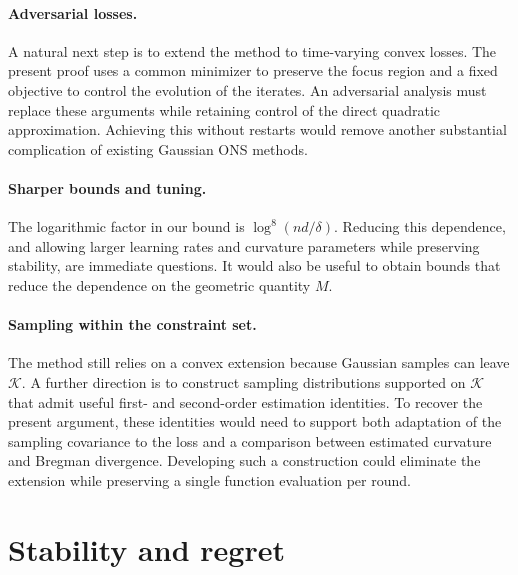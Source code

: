 \documentclass[12pt,cleveref]{jmlr}
\newcommand{\K}{\mathcal K}
\newcommand{\1}{\mathbf 1}
\begin{document}
\paragraph{Adversarial losses.}
A natural next step is to extend the method to time-varying convex losses.
The present proof uses a common minimizer to preserve the focus region
and a fixed objective to control the evolution of the iterates.
An adversarial analysis must replace these arguments while retaining
control of the direct quadratic approximation. Achieving this without
restarts would remove another substantial complication of existing
Gaussian ONS methods.

\paragraph{Sharper bounds and tuning.}
The logarithmic factor in our bound is $\log^8(nd/\delta)$.
Reducing this dependence, and allowing larger learning rates and curvature
parameters while preserving stability, are immediate questions.
It would also be useful to obtain bounds that reduce the dependence on the geometric quantity $M$.

\paragraph{Sampling within the constraint set.}
The method still relies on a convex extension because Gaussian samples
can leave $\K$. A further direction is to construct sampling distributions
supported on $\K$ that admit useful first- and second-order estimation
identities. To recover the present argument, these identities would need
to support both adaptation of the sampling covariance to the loss and a
comparison between estimated curvature and Bregman divergence.
Developing such a construction could eliminate the extension while
preserving a single function evaluation per round.

\newpage
\begingroup
\raggedright
\providecommand{\doi}[1]{\href{https://doi.org/#1}{doi:\nolinkurl{#1}}}
\nocite{vershynin2018high}

\endgroup

\newpage
\appendix
\section{Stability and regret}
\label{sec:stability}
\label{sec:stochastic-control}
\end{document}
